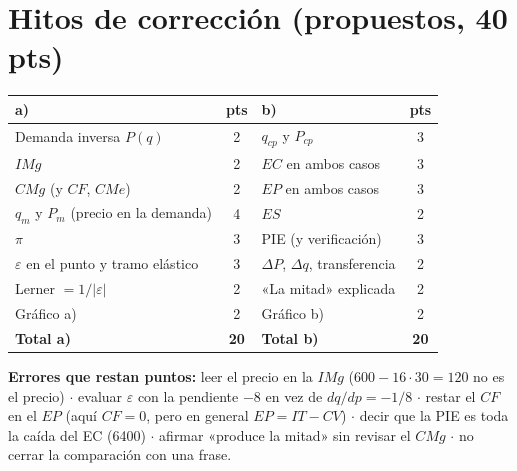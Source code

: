 \documentclass[11pt]{article}
\begin{document}
\section*{Hitos de corrección (propuestos, 40 pts)}

\begin{center}
\begin{tabular}{@{}lc@{\qquad}lc@{}}
\toprule
\textbf{a)} & pts & \textbf{b)} & pts \\
\midrule
Demanda inversa $P(q)$ & 2 & $q_{cp}$ y $P_{cp}$ & 3 \\
$IMg$ & 2 & $EC$ en ambos casos & 3 \\
$CMg$ (y $CF$, $CMe$) & 2 & $EP$ en ambos casos & 3 \\
$q_m$ y $P_m$ (precio en la demanda) & 4 & $ES$ & 2 \\
$\pi$ & 3 & PIE (y verificación) & 3 \\
$\varepsilon$ en el punto y tramo elástico & 3 & $\Delta P$, $\Delta q$, transferencia & 2 \\
Lerner $= 1/|\varepsilon|$ & 2 & «La mitad» explicada & 2 \\
Gráfico a) & 2 & Gráfico b) & 2 \\
\midrule
\textbf{Total a)} & \textbf{20} & \textbf{Total b)} & \textbf{20} \\
\bottomrule
\end{tabular}
\end{center}

\begin{error}
\textbf{Errores que restan puntos:} leer el precio en la $IMg$ ($600 - 16\cdot 30 = 120$ no es el precio) $\cdot$ evaluar $\varepsilon$ con la pendiente $-8$ en vez de $dq/dp = -1/8$ $\cdot$ restar el $CF$ en el $EP$ (aquí $CF = 0$, pero en general $EP = IT - CV$) $\cdot$ decir que la PIE es toda la caída del EC (6400) $\cdot$ afirmar «produce la mitad» sin revisar el $CMg$ $\cdot$ no cerrar la comparación con una frase.
\end{error}
\end{document}
